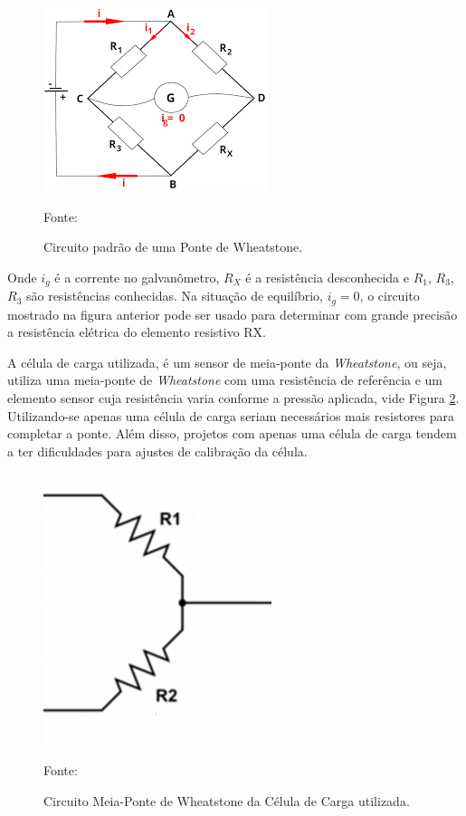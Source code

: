 \begin{figure}[H]
  \centering
  \includegraphics[scale=0.6]{figuras/ponte_wheatstone.png}
  \caption{Circuito padrão de uma Ponte de Wheatstone.}
  {\footnotesize Fonte: \cite{ponte_wheatstone}} 
  \label{fig:ponte_wheatstone}
\end{figure}

\par Onde $i_{g}$ é a corrente no galvanômetro, $R_{X}$ é a resistência desconhecida e $R_{1}$, $R_{3}$, $R_{3}$ são resistências conhecidas. Na situação de equilíbrio, $i_{g} = 0$, o circuito mostrado na figura anterior pode ser usado para determinar com grande precisão a resistência elétrica do elemento resistivo RX. 
\par A célula de carga utilizada, é um sensor de meia-ponte da \textit{Wheatstone}, ou seja, utiliza uma meia-ponte de \textit{Wheatstone} com uma resistência de referência e um elemento sensor cuja resistência varia conforme a pressão aplicada, vide Figura \ref{fig:half_wheatstone}. Utilizando-se apenas uma célula de carga seriam necessários mais resistores para completar a ponte. Além disso, projetos com apenas uma célula de carga tendem a ter dificuldades para ajustes de calibração da célula.

\begin{figure}[H]
  \centering
  \includegraphics[scale=0.6]{figuras/half_wheatstone.png}
  \caption{Circuito Meia-Ponte de Wheatstone da Célula de Carga utilizada.}
  {\footnotesize Fonte: \cite{half_wheatstone}} 
  \label{fig:half_wheatstone}
\end{figure}

